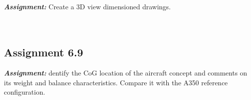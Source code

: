 \documentclass{article}
\begin{document}
\textbf{\textit{Assignment:}} Create a 3D view dimensioned drawings. \\ \\ \\ 

\clearpage

\subsection{Assignment 6.9\label{Assignment_6.9}}

\textbf{\textit{Assignment:}} dentify the CoG location of the aircraft concept and comments
on its weight and balance characteristics. 
Compare it with the A350 reference configuration. \\ \\ \\ 

\clearpage




\pagebreak
\printbibliography
    
\end{document}
